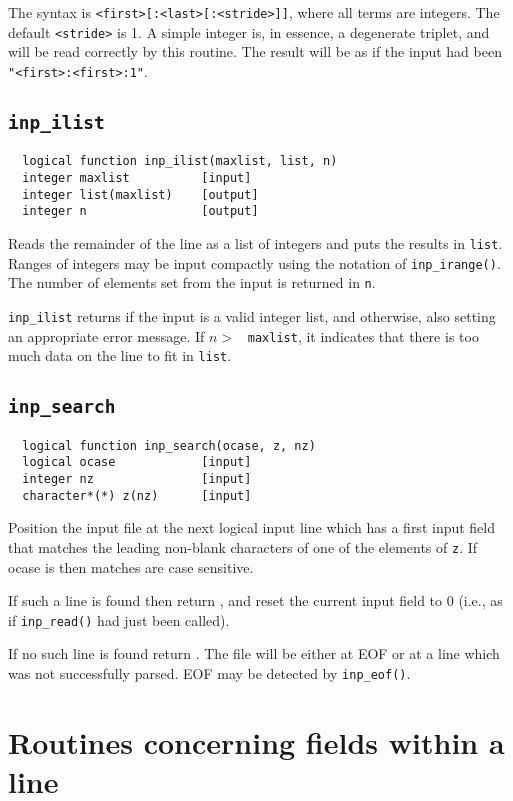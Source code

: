 The syntax is \verb+<first>[:<last>[:<stride>]]+, where all terms are
integers.  The default \verb+<stride>+ is 1.  A simple integer is, in
essence, a degenerate triplet, and will be read correctly by this
routine.  The result will be as if the input had been
\verb+"<first>:<first>:1"+.

\subsection{{\tt inp\_ilist}}
\begin{verbatim}
  logical function inp_ilist(maxlist, list, n)
  integer maxlist          [input]
  integer list(maxlist)    [output]
  integer n                [output]
\end{verbatim}
Reads the remainder of the line as a list of integers and puts the
results in {\tt list}.  Ranges of integers may be input compactly
using the notation of \verb+inp_irange()+. The number of elements set
from the input is returned in \verb+n+.

\verb+inp_ilist+ returns \TRUE if the input is a valid integer
list, and \FALSE otherwise, also setting an appropriate error
message.  If $n > $ ~{\tt maxlist}, it indicates that there is too
much data on the line to fit in {\tt list}.

\subsection{{\tt inp\_search}}
\begin{verbatim}
  logical function inp_search(ocase, z, nz)
  logical ocase            [input]
  integer nz               [input]
  character*(*) z(nz)      [input]
\end{verbatim}
Position the input file at the next logical input line which has a
first input field that matches the leading non-blank characters of one
of the elements of \verb+z+.  If ocase is \TRUE then matches are case
sensitive.

If such a line is found then return \TRUE, and reset the
current input field to 0 (i.e., as if \verb+inp_read()+ had just been
called).

If no such line is found return \FALSE\@.  The file will be
either at EOF or at a line which was not successfully parsed.  EOF may
be detected by \verb+inp_eof()+.

\section{Routines concerning fields within a line}

